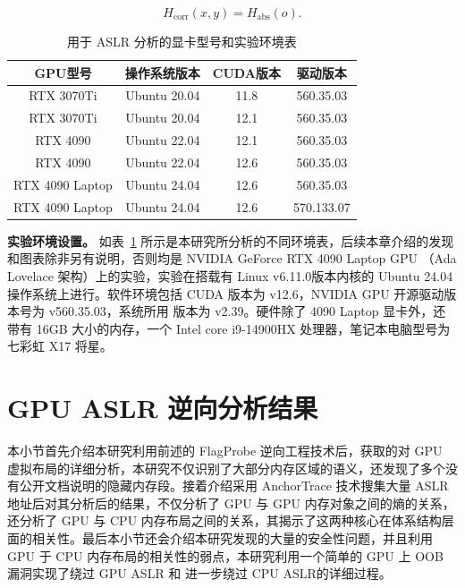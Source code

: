 \begin{equation}
    \label{equ:correlation_entropy}
    H_{\text{corr}}(x, y) = H_{\text{abs}}(o).
\end{equation}

\begin{table}[t]
\renewcommand{\arraystretch}{1.5}
\small
\centering
\caption{用于 ASLR 分析的显卡型号和实验环境表}
\label{tab: GPU experiments}
\begin{tabular}{cccc}
\hline
\cellcolor[HTML]{C0C0C0}\textbf{GPU型号} & 
\cellcolor[HTML]{C0C0C0}\textbf{操作系统版本} & 
\cellcolor[HTML]{C0C0C0}\textbf{CUDA版本} & 
\cellcolor[HTML]{C0C0C0}\textbf{驱动版本} \\
\hline
RTX 3070Ti & Ubuntu 20.04  & 11.8 & 560.35.03 \\
\cellcolor[HTML]{EFEFEF}RTX 3070Ti & \cellcolor[HTML]{EFEFEF}Ubuntu 20.04  & \cellcolor[HTML]{EFEFEF}12.1 & \cellcolor[HTML]{EFEFEF}560.35.03 \\
RTX 4090 & Ubuntu 22.04  & 12.1 & 560.35.03 \\
\cellcolor[HTML]{EFEFEF}RTX 4090 & \cellcolor[HTML]{EFEFEF}Ubuntu 22.04  & \cellcolor[HTML]{EFEFEF}12.6 & \cellcolor[HTML]{EFEFEF}560.35.03 \\
RTX 4090 Laptop & Ubuntu 24.04  & 12.6 & 560.35.03 \\ 
\cellcolor[HTML]{EFEFEF}RTX 4090 Laptop & \cellcolor[HTML]{EFEFEF}Ubuntu 24.04  & \cellcolor[HTML]{EFEFEF}12.6 & \cellcolor[HTML]{EFEFEF}570.133.07 \\
\hline

\end{tabular}
\end{table}

\textbf{实验环境设置。}
如表~\ref{tab: GPU experiments} 所示是本研究所分析的不同环境表，后续本章介绍的发现和图表除非另有说明，否则均是 NVIDIA GeForce RTX 4090 Laptop GPU （Ada Lovelace 架构）上的实验，实验在搭载有 Linux v6.11.0版本内核的 Ubuntu 24.04 操作系统上进行。软件环境包括 CUDA 版本为 v12.6，NVIDIA GPU 开源驱动版本号为 v560.35.03，系统所用  版本为 v2.39。硬件除了 4090 Laptop 显卡外，还带有 16GB 大小的内存，一个 Intel core i9-14900HX 处理器，笔记本电脑型号为 七彩虹 X17 将星。


\section{GPU ASLR 逆向分析结果}
本小节首先介绍本研究利用前述的 FlagProbe 逆向工程技术后，获取的对 GPU 虚拟布局的详细分析，本研究不仅识别了大部分内存区域的语义，还发现了多个没有公开文档说明的隐藏内存段。接着介绍采用 AnchorTrace 技术搜集大量 ASLR 地址后对其分析后的结果，不仅分析了 GPU 与 GPU 内存对象之间的熵的关系，还分析了 GPU 与 CPU 内存布局之间的关系，其揭示了这两种核心在体系结构层面的相关性。最后本小节还会介绍本研究发现的大量的安全性问题，并且利用 GPU 于 CPU 内存布局的相关性的弱点，本研究利用一个简单的 GPU 上 OOB 漏洞实现了绕过 GPU ASLR 和 进一步绕过 CPU ASLR的详细过程。

